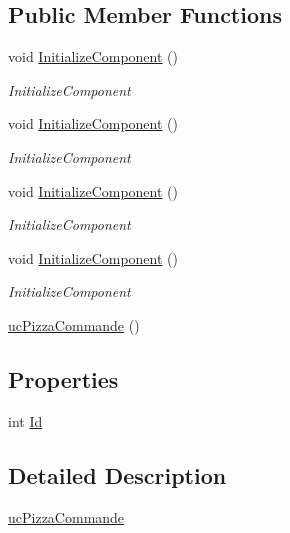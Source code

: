 \subsection*{Public Member Functions}
\begin{DoxyCompactItemize}
\item 
void \hyperlink{classnewPizza1_1_1ucPizzaCommande_a64b08961b7d2239fe9cf481dad628572}{Initialize\+Component} ()
\begin{DoxyCompactList}\small\item\em Initialize\+Component \end{DoxyCompactList}\item 
void \hyperlink{classnewPizza1_1_1ucPizzaCommande_a64b08961b7d2239fe9cf481dad628572}{Initialize\+Component} ()
\begin{DoxyCompactList}\small\item\em Initialize\+Component \end{DoxyCompactList}\item 
void \hyperlink{classnewPizza1_1_1ucPizzaCommande_a64b08961b7d2239fe9cf481dad628572}{Initialize\+Component} ()
\begin{DoxyCompactList}\small\item\em Initialize\+Component \end{DoxyCompactList}\item 
void \hyperlink{classnewPizza1_1_1ucPizzaCommande_a64b08961b7d2239fe9cf481dad628572}{Initialize\+Component} ()
\begin{DoxyCompactList}\small\item\em Initialize\+Component \end{DoxyCompactList}\item 
\hyperlink{classnewPizza1_1_1ucPizzaCommande_ae864312c0544be9c10f461fda4213240}{uc\+Pizza\+Commande} ()
\end{DoxyCompactItemize}
\subsection*{Properties}
\begin{DoxyCompactItemize}
\item 
int \hyperlink{classnewPizza1_1_1ucPizzaCommande_afe0ddbd6aba3c755b201101b7097344a}{Id}
\end{DoxyCompactItemize}


\subsection{Detailed Description}
\hyperlink{classnewPizza1_1_1ucPizzaCommande}{uc\+Pizza\+Commande} 

